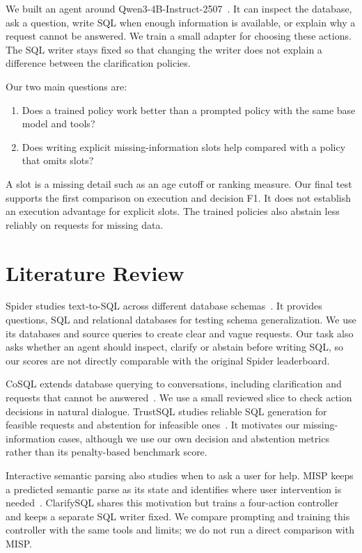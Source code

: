 \documentclass[11pt,a4paper]{article}
\begin{document}
We built an agent around Qwen3-4B-Instruct-2507~\cite{qwen}. It can inspect the database, ask a question,
write SQL when enough information is available, or explain why a request cannot be answered. We train
a small adapter for choosing these actions. The SQL writer stays fixed so that changing the writer
does not explain a difference between the clarification policies.

Our two main questions are:
\begin{enumerate}
\item Does a trained policy work better than a prompted policy with the same base model and tools?
\item Does writing explicit missing-information slots help compared with a policy that omits slots?
\end{enumerate}
A slot is a missing detail such as an age cutoff or ranking measure. Our final test supports the first
comparison on execution and decision F1. It does not establish an execution advantage for explicit slots.
The trained policies also abstain less reliably on requests for missing data.

\section{Literature Review}

Spider studies text-to-SQL across different database schemas~\cite{spider}. It provides questions,
SQL and relational databases for testing schema generalization. We use its databases and source queries
to create clear and vague requests. Our task also asks whether an agent should inspect, clarify or
abstain before writing SQL, so our scores are not directly comparable with the original Spider leaderboard.

CoSQL extends database querying to conversations, including clarification and requests that cannot be
answered~\cite{cosql}. We use a small reviewed slice to check action decisions in natural dialogue.
TrustSQL studies reliable SQL generation for feasible requests and abstention for infeasible
ones~\cite{trustsql}. It motivates our missing-information cases, although we use our own decision and
abstention metrics rather than its penalty-based benchmark score.

Interactive semantic parsing also studies when to ask a user for help. MISP keeps a predicted semantic
parse as its state and identifies where user intervention is needed~\cite{misp}. ClarifySQL shares this
motivation but trains a four-action controller and keeps a separate SQL writer fixed. We compare
prompting and training this controller with the same tools and limits; we do not run a direct comparison
with MISP.
\end{document}
